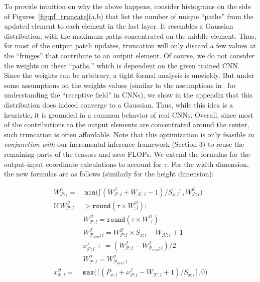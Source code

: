 To provide intuition on why the above happens, consider histograms on the side of Figures~\ref{fig:pf_truncate}(a,b) that list the number of unique ``paths'' from the updated element to each element in the last layer. It resembles a Gaussian distribution, with the maximum paths concentrated on the middle element. Thus, for most of the output patch updates, truncation will only discard a few values at the ``fringes'' that contribute to an output element. Of course, we do not consider the weights on these ``paths,'' which is dependent on the given trained CNN. Since the weights can be arbitrary, a tight formal analysis is unwieldy. But under some assumptions on the weights values (similar to the assumptions in~\cite{luo2016understanding} for understanding the ``receptive field'' in CNNs), we show in the appendix that this distribution does indeed converge to a Gaussian. Thus, while this idea is a heuristic, it is grounded in a common behavior of real CNNs.
Overall, since most of the contributions to the output elements are concentrated around the center, such truncation is often affordable. Note that this optimization is only feasible \textit{in conjunction with} our incremental inference framework (Section 3) to reuse the remaining parts of the tensors and save FLOPs.
We extend the formulas for the output-input coordinate calculations to account for $\tau$. For the width dimension,  the new formulas are as follows (similarly for the height dimension):

\vspace{-5mm}
\begin{align}
\label{eqn:normal_width_calc}
W^\mathcal{O}_{\mathcal{P}:l} = &~ \texttt{min}\big(\lceil (W^\mathcal{I}_{\mathcal{P}:l} + W_{\mathcal{K}:l} - 1)/S_{x:l} \rceil, W^\mathcal{O}_{\mathcal{P}:l}\big)\\
\label{eqn:check_tau}
\text{If}~ W_{\mathcal{P}:l}^\mathcal{O} & > \texttt{round}(\tau \times W^\mathcal{O}_{:l}):\\
\label{eqn:new_width_calc_with_tau}
& W^\mathcal{O}_{\mathcal{P}:l} = \texttt{round}(\tau \times W^\mathcal{O}_{:l})\\
\label{eqn:new_in_width}
& W^\mathcal{I}_{\mathcal{P}_{new}:l} = W^\mathcal{O}_{\mathcal{P}:l} \times S_{x:l} - W_{\mathcal{K}:l} + 1\\
\label{eqn:new_x_coord}
& x^{\mathcal{I}}_{\mathcal{P}:l} \mathrel{+}= (W^\mathcal{I}_{\mathcal{P}:l} - W^\mathcal{I}_{\mathcal{P}_{new}:l})/2\\
\label{eqn:new_input_width}
& W^\mathcal{I}_{\mathcal{P}:l} = W^\mathcal{I}_{\mathcal{P}_{new}:l}\\
\label{eqn:new_output_x}
x^\mathcal{O}_{\mathcal{P}:l} = & \texttt{max}\big(\lceil (P_{x:l} + x^\mathcal{I}_{\mathcal{P}:l} - W_{\mathcal{K}:l} + 1)/S_{x:l} \rceil, 0\big)
\end{align}

